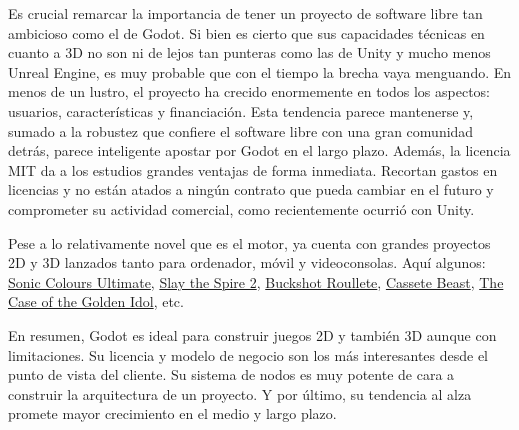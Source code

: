Es crucial remarcar la importancia de tener un proyecto de software libre tan ambicioso como el de Godot. Si bien es cierto que sus capacidades técnicas en cuanto a 3D no son ni de lejos tan punteras como las de Unity y mucho menos Unreal Engine, es muy probable que con el tiempo la brecha vaya menguando. En menos de un lustro, el proyecto ha crecido enormemente en todos los aspectos: usuarios, características y financiación. Esta tendencia parece mantenerse y, sumado a la robustez que confiere el software libre con una gran comunidad detrás, parece inteligente apostar por Godot en el largo plazo. Además, la licencia MIT da a los estudios grandes ventajas de forma inmediata. Recortan gastos en licencias y no están atados a ningún contrato que pueda cambiar en el futuro y comprometer su actividad comercial, como recientemente ocurrió con Unity.

Pese a lo relativamente novel que es el motor, ya cuenta con grandes proyectos 2D y 3D lanzados tanto para ordenador, móvil y videoconsolas. Aquí algunos: \href{https://www.nintendo.com/es-es/Juegos/Juegos-de-Nintendo-Switch/Sonic-Colours-Ultimate-2014880.html?srsltid=AfmBOopP2Gm2S3Zo5fcoc3Ifz5E1b136K8O_6Y2vLMouJm2Zj5LI0aut}{Sonic Colours Ultimate}, \href{https://store.steampowered.com/app/2868840/Slay_the_Spire_2/}{Slay the Spire 2}, \href{https://store.steampowered.com/app/2835570/Buckshot_Roulette/}{Buckshot Roullete}, \href{https://store.steampowered.com/app/1321440/Cassette_Beasts/}{Cassete Beast}, \href{https://store.steampowered.com/app/1677770/The_Case_of_the_Golden_Idol/}{The Case of the Golden Idol}, etc.

En resumen, Godot es ideal para construir juegos 2D y también 3D aunque con limitaciones. Su licencia y modelo de negocio son los más interesantes desde el punto de vista del cliente. Su sistema de nodos es muy potente de cara a construir la arquitectura de un proyecto. Y por último, su tendencia al alza promete mayor crecimiento en el medio y largo plazo.